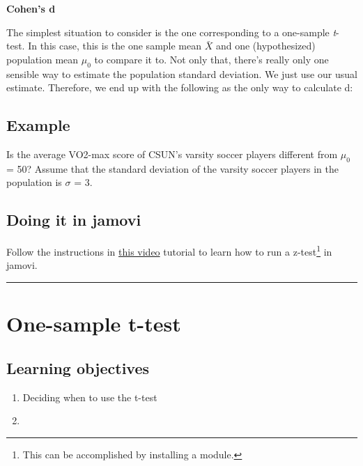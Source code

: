 \documentclass[
]{article}
\providecommand{\tightlist}{%
  \setlength{\itemsep}{0pt}\setlength{\parskip}{0pt}}
\begin{document}
\textbf{Cohen's d}

The simplest situation to consider is the one corresponding to a one-sample \emph{t}-test. In this case, this is the one sample mean \(\bar{X}\) and one (hypothesized) population mean \(\mu_0\) to compare it to. Not only that, there's really only one sensible way to estimate the population standard deviation. We just use our usual estimate. Therefore, we end up with the following as the only way to calculate d:

\hypertarget{example}{%
\subsection{Example}\label{example}}

Is the average VO2-max score of CSUN's varsity soccer players different from \(\mu_0\) = 50? Assume that the standard deviation of the varsity soccer players in the population is \(\sigma\) = 3.

\hypertarget{doing-it-in-jamovi}{%
\subsection{Doing it in jamovi}\label{doing-it-in-jamovi}}

Follow the instructions in \href{https://youtu.be/dE-fQzM86Ew}{this video} tutorial to learn how to run a z-test\footnote{This can be accomplished by installing a module.} in jamovi.

\begin{center}\rule{0.5\linewidth}{0.5pt}\end{center}

\hypertarget{one-sample-t-test}{%
\section{One-sample t-test}\label{one-sample-t-test}}

\hypertarget{learning-objectives-1}{%
\subsection{Learning objectives}\label{learning-objectives-1}}

\begin{enumerate}
\def\labelenumi{\arabic{enumi}.}
\tightlist
\item
  Deciding when to use the t-test
\item
\end{enumerate}
\end{document}
